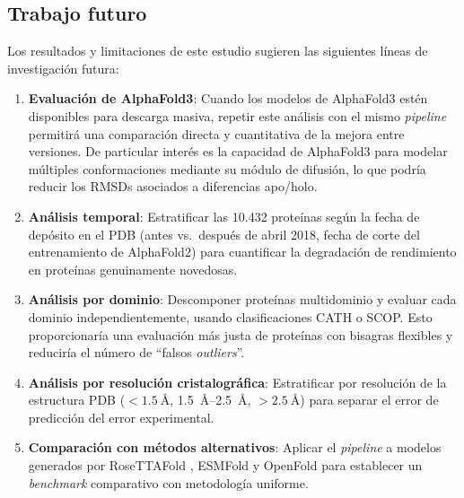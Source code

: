 \subsection{Trabajo futuro}
\label{subsec:trabajo_futuro}

Los resultados y limitaciones de este estudio sugieren las siguientes l\'ineas de
investigaci\'on futura:

\begin{enumerate}
    \item \textbf{Evaluaci\'on de AlphaFold3}: Cuando los modelos de AlphaFold3
    \citep{abramson2024accurate} est\'en disponibles para descarga masiva, repetir este
    an\'alisis con el mismo \textit{pipeline} permitir\'a una comparaci\'on directa y cuantitativa
    de la mejora entre versiones. De particular inter\'es es la capacidad de AlphaFold3
    para modelar m\'ultiples conformaciones mediante su m\'odulo de difusi\'on, lo que
    podr\'ia reducir los RMSDs asociados a diferencias apo/holo.

    \item \textbf{An\'alisis temporal}: Estratificar las 10.432 prote\'inas seg\'un la
    fecha de dep\'osito en el PDB (antes vs.\ despu\'es de abril 2018, fecha de corte
    del entrenamiento de AlphaFold2) para cuantificar la degradaci\'on de rendimiento
    en prote\'inas genuinamente novedosas.

    \item \textbf{An\'alisis por dominio}: Descomponer prote\'inas multidominio y
    evaluar cada dominio independientemente, usando clasificaciones CATH o SCOP. Esto
    proporcionar\'ia una evaluaci\'on m\'as justa de prote\'inas con bisagras flexibles
    y reducir\'ia el n\'umero de ``falsos \textit{outliers}''.

    \item \textbf{An\'alisis por resoluci\'on cristalográfica}: Estratificar por
    resoluci\'on de la estructura PDB ($< \SI{1,5}{\angstrom}$, \SIrange{1,5}{2,5}{\angstrom},
    $> \SI{2,5}{\angstrom}$) para separar el error de predicci\'on del error
    experimental.

    \item \textbf{Comparaci\'on con m\'etodos alternativos}: Aplicar el \textit{pipeline} a
    modelos generados por RoseTTAFold \citep{baek2021accurate}, ESMFold
    \citep{lin2023evolutionary} y OpenFold para establecer un \textit{benchmark} comparativo
    con metodolog\'ia uniforme.


\end{enumerate}
